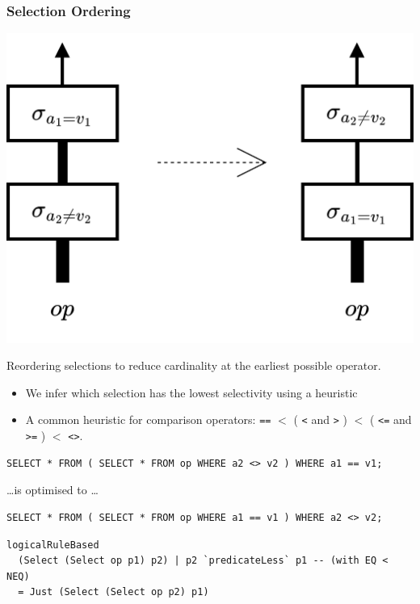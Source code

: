 \subsubsection{Selection Ordering}
\begin{center}
    \includegraphics[width=.4\textwidth]{optimisation/images/selection_reordering.drawio.png}
\end{center}
Reordering selections to reduce cardinality at the earliest possible operator.
\begin{itemize}
    \item We infer which selection has the lowest selectivity using a heuristic
    \item A common heuristic for comparison operators: \texttt{==} $ < $ ( \texttt{<} and \texttt{>} ) $ < $ ( \texttt{<=} and \texttt{>=} ) $ < $ \texttt{<>}.
\end{itemize}
\begin{verbatim}
SELECT * FROM ( SELECT * FROM op WHERE a2 <> v2 ) WHERE a1 == v1; 
\end{verbatim}
\dots is optimised to \dots
\begin{verbatim}
SELECT * FROM ( SELECT * FROM op WHERE a1 == v1 ) WHERE a2 <> v2;
\end{verbatim}
\begin{verbatim}
logicalRuleBased 
  (Select (Select op p1) p2) | p2 `predicateLess` p1 -- (with EQ < NEQ) 
  = Just (Select (Select op p2) p1)
\end{verbatim}

